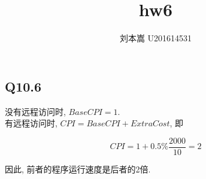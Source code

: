 \documentclass{article}
\begin{document}
\begin{CJK}{UTF8}{gbsn}

\title{hw6}
\author{刘本嵩 U201614531}

\maketitle


\section{Q10.6}
\Large
\smallskip

没有远程访问时, $BaseCPI = 1$. \\

有远程访问时, $CPI = BaseCPI + ExtraCost$, 即

$$CPI = 1 + 0.5\% \frac{2000}{10} = 2$$

因此, 前者的程序运行速度是后者的2倍.


\end{CJK}
\end{document}
